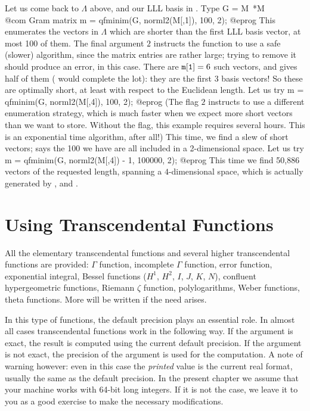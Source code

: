 Let us come back to $\Lambda$ above, and our LLL basis in . Type
\bprog
  G = M~*M  \\@com Gram matrix
  m = qfminim(G, norml2(M[,1]), 100, 2);
@eprog\noindent
This enumerates the vectors in $\Lambda$ which are shorter than the first LLL
basis vector, at most 100 of them. The final argument $2$ instructs the
function to use a safe (slower) algorithm, since the matrix entries are
rather large; trying to remove it should produce an error, in this case.
There are ${\tt m[1]} = 6$ such vectors, and  gives half of them
( would complete the lot): they are the first 3 basis vectors! So
these are optimally short, at least with respect to the Euclidean length. Let
us try
\bprog
  m = qfminim(G, norml2(M[,4]), 100, 2);
@eprog\noindent
(The flag $2$ instructs  to use a different enumeration
strategy, which is much faster when we expect more short vectors than we want
to store. Without the flag, this example requires several hours. This is an
exponential time algorithm, after all!) This time, we find a slew of short
vectors;  says the 100 we have are all included in a
2-dimensional space. Let us try
\bprog
  m = qfminim(G, norml2(M[,4]) - 1, 100000, 2);
@eprog\noindent
This time we find 50,886 vectors of the requested length, spanning a
$4$-dimensional space, which is actually generated by ,
  and .

\section{Using Transcendental Functions}

All the elementary transcendental functions and several higher transcendental
functions are provided: $\Gamma$ function, incomplete $\Gamma$ function, error
function, exponential integral, Bessel functions ($H^1$, $H^2$, $I$, $J$,
$K$, $N$), confluent hypergeometric functions, Riemann $\zeta$ function,
polylogarithms, Weber functions, theta functions. More will be written if the
need arises.

In this type of functions, the default precision plays an essential role.
In almost all cases transcendental functions work in the following way.
If the argument is exact, the result is computed using the current
default precision. If the argument is not exact, the precision of the
argument is used for the computation. A note of warning however: even in this
case the \emph{printed} value is the current real format, usually the
same as the default precision. In the present chapter we assume that your
machine works with 64-bit long integers. If it is not the case, we leave it
to you as a good exercise to make the necessary modifications.

